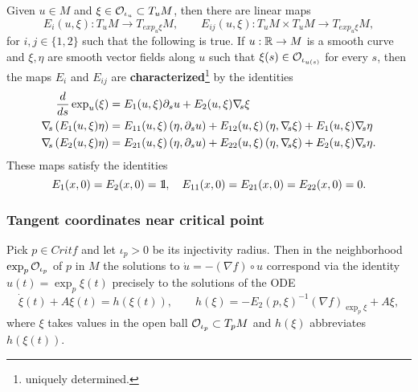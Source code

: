 \documentclass{article}
\begin{document}
\begin{theorem}\label{thm:exp-map}
Given $u\in M$ and $\xi\in{\mathcal{O}}_{\iota_u}\subset 
T_uM$, then there are linear maps
$$
  E_i (u,\xi):T_uM\to T_{exp_u\xi}M ,\qquad
  E_{ij}(u,\xi):T_uM\times T_uM\to T_{exp_u\xi}M,
$$
for $i,j\in\{1,2\}$ such that
the following is true. If $u:{\mathbb{R}}\to M$ is a smooth curve
and $\xi,\eta$ are smooth vector fields along $u$
such that $\xi(s)\in{\mathcal{O}}_{\iota_{u(s)}}$ for every $s$,
then the maps $E_i$ and $E_{ij}$ are
{\bf characterized}\footnote{uniquely determined.}
by the identities
\begin{equation} \label{eq:exponential-identity}
\begin{split}
     \frac{d}{ds}\exp_u(\xi)
    &=E_1(u,\xi)\p_su
     +E_2(u,\xi)\Nabla{s}\xi
    \\
     \Nabla{s}\left( E_1(u,\xi)\eta\right)
    &=E_{11}(u,\xi)\left(\eta,\p_s u\right)
      +E_{12}(u,\xi)\left(\eta,\Nabla{s}\xi\right)
      +E_1(u,\xi)\Nabla{s}\eta
    \\
     \Nabla{s}\left( E_2(u,\xi)\eta\right)
    &=E_{21}(u,\xi)\left(\eta,\p_s u\right)
      +E_{22}(u,\xi)\left(\eta,\Nabla{s}\xi\right)
      +E_2(u,\xi)\Nabla{s}\eta.
\end{split}
\end{equation}
These maps satisfy the identities
\begin{equation}\label{eq:E_ij(0)}
     E_1(x,0)=E_2(x,0)=\1
     ,\quad
     E_{11}(x,0)=E_{21}(x,0)=E_{22}(x,0)=0.
\end{equation}
\end{theorem}


\subsubsection*{Tangent coordinates near critical point}%
\begin{lemma}\label{le:conv-coord}
Pick $p\in Crit f$ and let $\iota_p>0$ be its
injectivity radius. Then in the neighborhood
$\exp_p{\mathcal{O}}_{\iota_p}$ of $p$ in $M$ the solutions
to $\dot u=-(\nabla f)\circ u$ correspond
via the identity $u(t)=\exp_p\xi(t)$ precisely to
the solutions of the ODE
\begin{equation}\label{eq:f}
     \dot\xi(t)+A\xi(t)=h(\xi(t))
     ,\qquad
     h(\xi)=-E_2(p,\xi)^{-1}(\nabla f)_{\exp_p\xi}
     +A\xi,
\end{equation}
where $\xi$ takes values in the open ball
${\mathcal{O}}_{\iota_p}\subset T_p M$
and $h(\xi)$ abbreviates $h(\xi(t))$.
\end{lemma}
\end{document}
